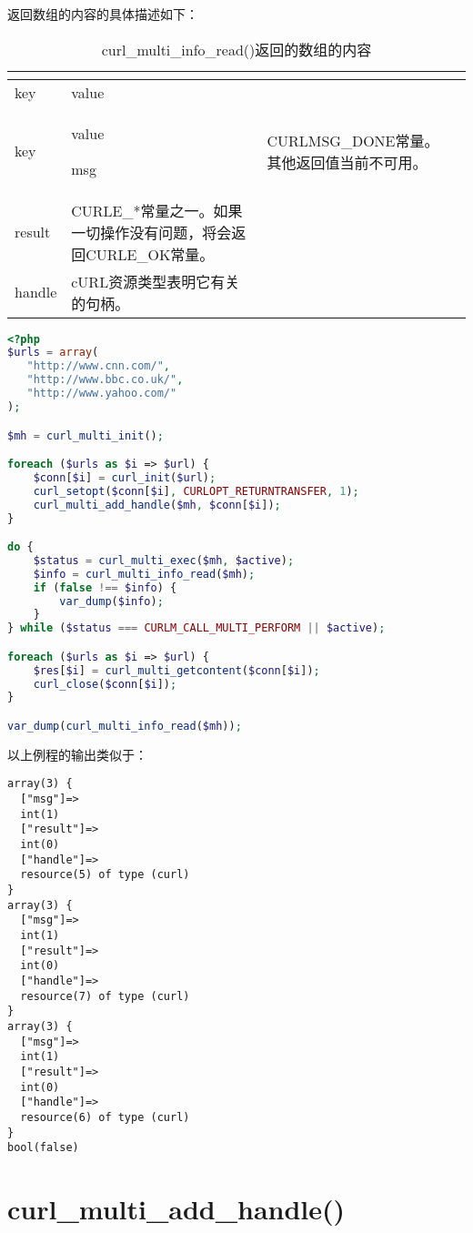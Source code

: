 返回数组的内容的具体描述如下：


\begin{longtable}{|m{50pt}|m{200pt}|}
\tabularnewline\hline
key&value
\endhead

\caption{curl\_multi\_info\_read()返回的数组的内容}\\
\hline
key&value
\endfirsthead

\endfoot

\endlastfoot
\hline
msg & CURLMSG\_DONE常量。其他返回值当前不可用。\\
\hline
result & CURLE\_*常量之一。如果一切操作没有问题，将会返回CURLE\_OK常量。\\
\hline
handle&cURL资源类型表明它有关的句柄。\\
\hline
\end{longtable}

\begin{lstlisting}[language=PHP]
<?php
$urls = array(
   "http://www.cnn.com/",
   "http://www.bbc.co.uk/",
   "http://www.yahoo.com/"
);

$mh = curl_multi_init();

foreach ($urls as $i => $url) {
    $conn[$i] = curl_init($url);
    curl_setopt($conn[$i], CURLOPT_RETURNTRANSFER, 1);
    curl_multi_add_handle($mh, $conn[$i]);
}

do {
    $status = curl_multi_exec($mh, $active);
    $info = curl_multi_info_read($mh);
    if (false !== $info) {
        var_dump($info);
    }
} while ($status === CURLM_CALL_MULTI_PERFORM || $active);

foreach ($urls as $i => $url) {
    $res[$i] = curl_multi_getcontent($conn[$i]);
    curl_close($conn[$i]);
}

var_dump(curl_multi_info_read($mh));
\end{lstlisting}

以上例程的输出类似于：



\begin{lstlisting}
array(3) {
  ["msg"]=>
  int(1)
  ["result"]=>
  int(0)
  ["handle"]=>
  resource(5) of type (curl)
}
array(3) {
  ["msg"]=>
  int(1)
  ["result"]=>
  int(0)
  ["handle"]=>
  resource(7) of type (curl)
}
array(3) {
  ["msg"]=>
  int(1)
  ["result"]=>
  int(0)
  ["handle"]=>
  resource(6) of type (curl)
}
bool(false)
\end{lstlisting}

\section{curl\_multi\_add\_handle()}

